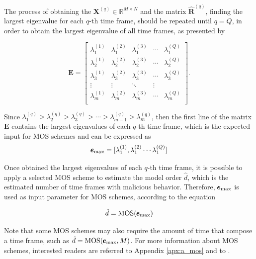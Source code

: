 The process of obtaining the $\pmb{X}^{(q)} \in \mathbb{R}^{M\times{N}}$ and the matrix $\hat{\pmb{R}}^{(q)}$, finding the largest eigenvalue for each $q$-th time frame, should be repeated until $q = Q$, in order to obtain the largest eigenvalue of all time frames, as presented by 

\begin{equation}\label{eq:3.08}
	\pmb{E} =
	\begin{bmatrix}
		\lambda_1^{(1)} & \lambda_1^{(2)} & \lambda_1^{(3)} & \cdots & \lambda_1^{(Q)} \\
		\lambda_2^{(1)} & \lambda_2^{(2)} & \lambda_2^{(3)} & \cdots & \lambda_2^{(Q)} \\
		\lambda_3^{(1)} & \lambda_3^{(2)} & \lambda_3^{(3)} & \cdots & \lambda_3^{(Q)} \\
		\vdots & \vdots & \ddots & \vdots  \\
		\lambda_m^{(1)} & \lambda_m^{(2)} & \lambda_m^{(3)} & \cdots & \lambda_m^{(Q)} \\
	\end{bmatrix}.
\end{equation}

Since $\lambda_1^{(q)} > \lambda_2^{(q)} > \lambda_3^{(q)} > \cdots > \lambda_{m-1}^{(q)} > \lambda_m^{(q)}$, then the first line of the matrix $\pmb{E}$ contains the largest eigenvalues of each $q$-th time frame, which is the expected input for MOS schemes and can be expressed as 
\begin{equation}\label{eq:3.09}
	\pmb{e}_{\rm max} = [ \lambda_1^{(1)}, \lambda_1^{(2)} \cdots \lambda_1^{(Q)}]
\end{equation}

Once obtained the largest eigenvalues of each $q$-th time frame, it is possible to apply a selected MOS scheme to estimate the model order $\hat{d}$, which is the estimated number of time frames with malicious behavior. Therefore, $\pmb{e}_{\rm max}$ is used as input parameter for MOS schemes, according to the equation

\begin{equation}\label{eq:3.10}
	\hat{d} = \textrm{MOS}(\pmb{e}_{\rm max})
\end{equation}

Note that some MOS schemes may also require the amount of time that compose a time frame, such as $\hat{d} = \textrm{MOS}(\pmb{e}_{\rm max}, M)$. For more information about MOS schemes, interested readers are referred to Appendix \ref{apx:a_mos} and to \cite{da2009comparison}.

